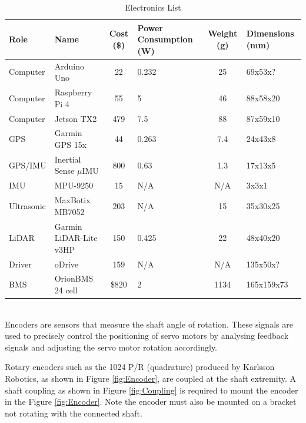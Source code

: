 \begin{table} [hb!]
    \centering
    \caption{Electronics List}
    \begin{tabular}{| l | l | c | p{2.5cm} | c | p{2.5cm} |} \hline
        Role & Name & Cost (\$) & Power \newline Consumption \newline (W) & Weight (g) & Dimensions \newline (mm)
        \\ \hline
        Computer & Arduino Uno \cite{arduino_arduino_nodate} & 22 & 0.232 & 25 & 69x53x?
        \\ \hline
        Computer & Raspberry Pi 4 \cite{raspberry_pi_raspberry_nodate} & 55 & 5 & 46 & 88x58x20
        \\ \hline
        Computer & Jetson TX2 \cite{nvidia_jetson_2017} & 479 & 7.5 & 88 & 87x59x10
        \\ \hline
        GPS & Garmin GPS 15x \cite{garmin_gps_2011} & 44 & 0.263 & 7.4 & 24x43x8
        \\ \hline
        GPS/IMU & Inertial Sense $\mu$IMU \cite{inertial_sense_imu_nodate} & 800 & 0.63 & 1.3 & 17x13x5
        \\ \hline
        IMU & MPU-9250 \cite{sparkfun_sparkfun_nodate} & 15 &  N/A & N/A & 3x3x1
        \\ \hline
        Ultrasonic & MaxBotix MB7052 \cite{maxbotix_mb7052_nodate} & 203 & N/A & 15 & 35x30x25
        \\ \hline
        LiDAR & Garmin LiDAR-Lite v3HP \cite{garmin_lidar-lite_nodate} & 150 & 0.425 & 22 & 48x40x20
        \\ \hline
        Driver & oDrive \cite{weigl_odrive_nodate} & 159 & N/A & N/A & 135x50x?
        \\ \hline
        BMS & OrionBMS 24 cell \cite{orion_bms_orion_nodate} & \$820 & 2 & 1134 & 165x159x73
        \\ \hline
    \end{tabular}
    \label{table:electronics}
\end{table}

\mbox{}\\

Encoders are sensors that measure the shaft angle of rotation. These signals are used to precisely control the positioning of servo motors by analysing feedback signals and adjusting the servo motor rotation accordingly. \cite{omron_overview_nodate}

Rotary encoders such as the 1024 P/R (quadrature) produced by Karlsson Robotics, as shown in Figure \ref{fig:Encoder}, are coupled at the shaft extremity. A shaft coupling as shown in Figure \ref{fig:Coupling} is required to mount the encoder in the Figure \ref{fig:Encoder}. Note the encoder must also be mounted on a bracket not rotating with the connected shaft.


